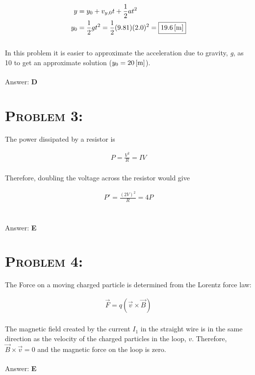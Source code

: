 \documentclass{article}
\begin{document}
\begin{align}
y &=  y_{0} + v_{y,0} t + \frac{1}{2} a t^2\\
y_{0} &= \frac{1}{2} g t^2 = \frac{1}{2} (9.81) (2.0)^2 = \boxed{\unit[19.6]{[m]}}\nonumber
\end{align}
\\
In this problem it is easier to approximate the acceleration due to gravity, \textit{g}, as 10 to get an approximate solution ($y_{0} = \unit[20]{[m]}$).
\\\\
Answer: \textbf{\textcolor{ProcessBlue}D}\\


\section{\textsc{Problem 3:}}  The power dissipated by a resistor is

\begin{align}
P  = \frac{V^2}{R} = IV
\end{align}
\\
Therefore, doubling the voltage across the resistor would give

\begin{align}
P' = \frac{(2V)^2}{R} = \boxed{4 P}\nonumber
\end{align}
\\\\
Answer: \textbf{\textcolor{ProcessBlue}E}\\


\section{\textsc{Problem 4:}} The Force on a moving charged particle is determined from the Lorentz force law:

\begin{align}
\textbf{$\vec{F}$} = q (\textbf{$\vec{v}$}\times\textbf{$\vec{B}$})
\end{align}
\\
The magnetic field created by the current $I_{1}$ in the straight wire is in the same direction as the velocity of the charged particles in the loop, ${v}$. Therefore, $\vec{B} \times \vec{v}=0$ and the magnetic force on the loop is zero.\\\\
Answer: \textbf{\textcolor{ProcessBlue}E}\\
\end{document}
